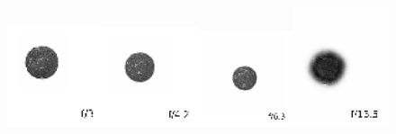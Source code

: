 \begin{figure}[ht]
\centering
\includegraphics[width=0.25\textwidth]{FRD/figs/bdirect_3.eps}\includegraphics[width=0.25\textwidth]{FRD/figs/bdirect_42.eps}\includegraphics[width=0.25\textwidth]{FRD/figs/bdirect_63.eps}\includegraphics[width=0.25\textwidth]{FRD/figs/bdirect_135.eps}\\

\end{figure}
